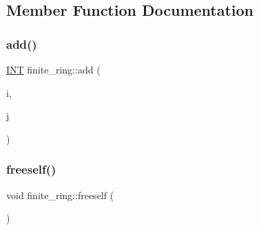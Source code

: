 \subsection{Member Function Documentation}
\mbox{\label{classfinite__ring_ab273f801356e9e0599e7610cc748930f}} 
\subsubsection{\texorpdfstring{add()}{add()}}
{\footnotesize\ttfamily \mbox{\hyperlink{galois_8h_a09fddde158a3a20bd2dcadb609de11dc}{I\+NT}} finite\+\_\+ring\+::add (\begin{DoxyParamCaption}\item[{\mbox{\hyperlink{galois_8h_a09fddde158a3a20bd2dcadb609de11dc}{I\+NT}}}]{i,  }\item[{\mbox{\hyperlink{galois_8h_a09fddde158a3a20bd2dcadb609de11dc}{I\+NT}}}]{j }\end{DoxyParamCaption})}

\mbox{\label{classfinite__ring_afe11cfb1049e98833001fc249825ec3d}} 
\subsubsection{\texorpdfstring{freeself()}{freeself()}}
{\footnotesize\ttfamily void finite\+\_\+ring\+::freeself (\begin{DoxyParamCaption}{ }\end{DoxyParamCaption})}

\mbox{\label{classfinite__ring_a1cf1d7300f1fbfa20b10e0e4ef1139b5}} 
